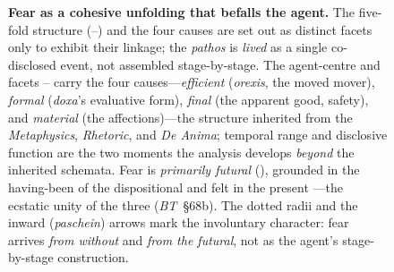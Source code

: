 \begin{figure}[htbp]
\begin{tikzpicture}
\end{tikzpicture}
\caption{\textbf{Fear as a cohesive unfolding that befalls the agent.} The five-fold
structure (--) and the four causes are set out as distinct facets only
to exhibit their linkage; the \textit{pathos} is \emph{lived} as a single co-disclosed
event, not assembled stage-by-stage. The agent-centre and facets --
carry the four causes---\emph{efficient} (\textit{orexis}, the moved mover),
\emph{formal} (\textit{doxa}'s evaluative form), \emph{final} (the apparent good,
safety), and \emph{material} (the affections)---the structure inherited from the
\textit{Metaphysics}, \textit{Rhetoric}, and \textit{De Anima};  temporal range
and  disclosive function are the two moments the analysis develops \emph{beyond}
the inherited schemata. Fear is \emph{primarily futural} (), grounded in the
having-been of the dispositional  and felt in the present ---the
ecstatic unity of the three (\textit{BT}~\S68b). The dotted radii and the inward
(\textit{paschein}) arrows mark the involuntary character: fear arrives \emph{from
without} and \emph{from the futural}, not as the agent's stage-by-stage construction.}
\label{fig:fear-fivefold}
\end{figure}
